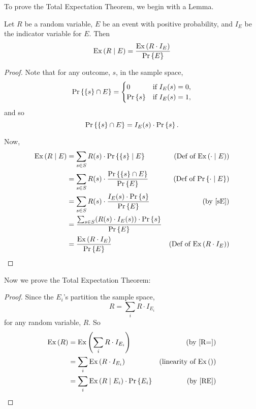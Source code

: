 \documentclass[12pt]{article}
\begin{document}
{To prove the Total Expectation Theorem, we begin with a Lemma.

\begin{lemma*}
Let $R$ be a random variable, $E$ be an event with positive probability,
and $I_E$ be the indicator variable for $E$.  Then
\begin{equation}\label{RE}
\ex{R \mid E}  = \frac{\ex{R \cdot I_E}}{\pr{E}}
\end{equation}
\end{lemma*}

\begin{proof}
Note that for any outcome, $s$, in the sample space,
\[
\pr{\set{s} \cap E} = \begin{cases} 0 & \text{if }I_E(s) = 0,\\
                                \pr{s} &  \text{if }I_E(s) = 1,
\end{cases}
\]
and so
\begin{equation}\label{sE}
\pr{\set{s}\cap E} = I_E(s) \cdot \pr{s}.
\end{equation}

Now,
\begin{align*}
\ex{R \mid E} & = \sum_{s \in S} R(s)\cdot \pr{\set{s} \mid E} & \text{(Def of
              $\ex{\cdot \mid E}$)}\\
              & = \sum_{s \in S} R(s)\cdot  \frac{\pr{\set{s} \cap E}}{\pr{E}} &
              \text{(Def of $\pr{\cdot \mid E}$)}\\
              & = \sum_{s \in S} R(s)\cdot 
              \frac{I_E(s) \cdot \pr{s}}{\pr{E}}  & \text{(by~\eqref{sE})}\\
             & = \frac{\sum_{s \in S} (R(s)\cdot I_E(s)) \cdot 
              \pr{s}}{\pr{E}}\\
             & = \frac{\ex{R\cdot I_E}}{\pr{E}} & \text{(Def of $\ex{R\cdot I_E}$)}
\end{align*}

\end{proof}

Now we prove the Total Expectation Theorem:

\begin{proof}
Since the $E_i$'s partition the sample space,
\begin{equation}\label{R=}
R = \sum_i R\cdot I_{E_i}
\end{equation}
for any random variable, $R$.  So
\begin{align*}
\ex{R} & = \ex{\sum_i R\cdot I_{E_i}}  & \text{(by~\eqref{R=})}\\
       & = \sum_i \ex{R\cdot I_{E_i}}  & \text{(linearity of $\ex{}$)}\\
       & = \sum_i \ex{R \mid E_i} \cdot \pr{E_i} & \text{(by~\eqref{RE})}
\end{align*}


\end{proof}}
\end{document}
